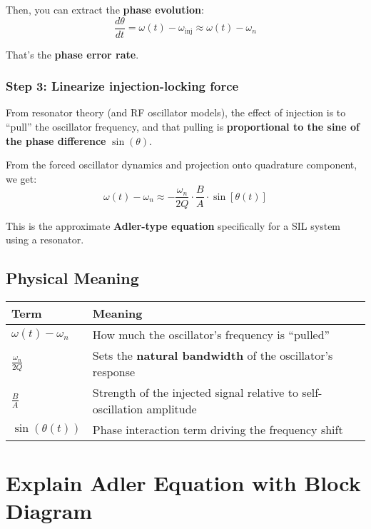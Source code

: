 \documentclass{article}
\begin{document}
Then, you can extract the \textbf{phase evolution}:
\begin{equation}
\frac{d\theta}{dt} = \omega(t) - \omega_{\text{inj}} \approx \omega(t) - \omega_n
\end{equation}

That's the \textbf{phase error rate}.

\subsubsection{Step 3: Linearize injection-locking force}

From resonator theory (and RF oscillator models), the effect of injection is to ``pull'' the oscillator frequency, and that pulling is \textbf{proportional to the sine of the phase difference} $\sin(\theta)$.

From the forced oscillator dynamics and projection onto quadrature component, we get:
\begin{equation}
\omega(t) - \omega_n \approx -\frac{\omega_n}{2Q} \cdot \frac{B}{A} \cdot \sin[\theta(t)]
\end{equation}

This is the approximate \textbf{Adler-type equation} specifically for a SIL system using a resonator.

\subsection{Physical Meaning}

\begin{center}
\begin{tabular}{>{\centering\arraybackslash}m{3cm} >{\raggedright\arraybackslash}m{8cm}}
\toprule
\textbf{Term} & \textbf{Meaning} \\
\midrule
$\omega(t) - \omega_n$ & How much the oscillator's frequency is ``pulled'' \\
$\frac{\omega_n}{2Q}$ & Sets the \textbf{natural bandwidth} of the oscillator's response \\
$\frac{B}{A}$ & Strength of the injected signal relative to self-oscillation amplitude \\
$\sin(\theta(t))$ & Phase interaction term driving the frequency shift \\
\bottomrule
\end{tabular}
\end{center}

\section{Explain Adler Equation with Block Diagram}
\end{document}
